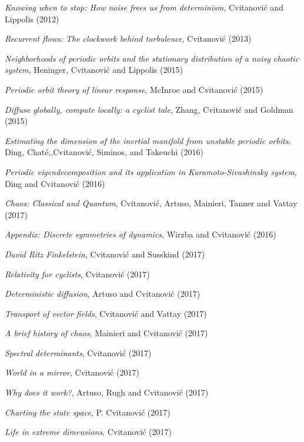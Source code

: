 {{
{\em Knowing when to stop: {How} noise frees us from determinism},
{Cvitanovi{\'c} and Lippolis}
{(2012)}

{\em Recurrent flows: {The} clockwork behind turbulence},
{Cvitanovi{\'c}}
{(2013)}

{\em Neighborhoods of periodic orbits and the stationary distribution of
a noisy chaotic system},
{Heninger, Cvitanovi{\'c} and Lippolis}
{(2015)}

{\em Periodic orbit theory of linear response},
{McInroe and Cvitanovi{\'c}}
{(2015)}

{\em Diffuse globally, compute locally: a cyclist tale},
{Zhang, Cvitanovi{\'c} and Goldman}
{(2015)}

{\em Estimating the dimension of the inertial manifold from unstable
periodic orbits},
{Ding, Chat\'e,,Cvitanovi\'c, Siminos, and Takeuchi}
{(2016)}

{\em Periodic eigendecomposition and its application in
{Kuramoto-Sivashinsky} system},
{Ding and Cvitanovi{\'c}}
{(2016)}

 {\em Chaos: {Classical and Quantum}},
{Cvitanovi{\'c}, Artuso, Mainieri, Tanner and Vattay}
{(2017)}

{\em Appendix: {Discrete} symmetries of dynamics},
{Wirzba and Cvitanovi{\'c}}
{(2016)}

{\em {David Ritz Finkelstein}},
{Cvitanovi{\'{c}} and Susskind}
{(2017)}

{\em Relativity for cyclists},
{Cvitanovi{\'c}}
{(2017)}

{\em Deterministic diffusion},
{Artuso and Cvitanovi{\'c}}
{(2017)}

{\em Transport of vector fields},
{Cvitanovi{\'c} and Vattay}
{(2017)}

{\em A brief history of chaos},
{Mainieri and Cvitanovi{\'c}}
{(2017)}

{\em Spectral determinants},
{Cvitanovi{\'c}}
{(2017)}

{\em World in a mirror},
{Cvitanovi{\'c}}
{(2017)}

{\em Why does it work?},
{Artuso, Rugh and Cvitanovi{\'c}}
{(2017)}

{\em Charting the state space},
{P. Cvitanovi\'{c}}
{(2017)}

{\em Life in extreme dimensions},
{Cvitanovi{\'c}}
{(2017)}

}}
